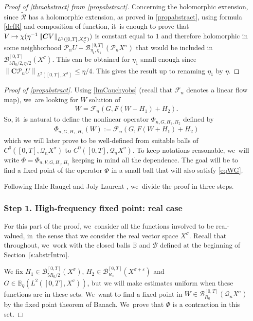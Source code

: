 \documentclass[10pt]{amsart}
\newcommand\mto{\mathchoice{\longmapsto}{\mapsto}{\mapsto}{\mapsto}}
\theoremstyle{definition}
\let\mc\mathcal
\let\veps\varepsilon
\newcommand{\B}{\mc{B}}
\newcommand{\Q}{\mathcal{Q}}
\renewcommand{\P}{\mathcal{P}}
\newcommand{\bC}{\boldsymbol{C}}
\newcommand\nor[2]{\left\|#1\right\|_{#2}}
\newcommand\FL{\mathcal{F}_{n}}
\begin{document}
\begin{proof}[Proof of \cref{thmabstract} from \cref{propabstract}]
Concerning the holomorphic extension, since $\mathcal{\widetilde{R}}$ has a holomorphic extension, as proved in \cref{propabstract}, using formula \eqref{defR} and composition of function, it~is enough to prove that $V\mto \chi(\eta^{-1} \nor{\bC V}{L^{2}([0,T],X^{\sigma}_{\mathbb{C}})})$ is constant equal to $1$ and therefore holomorphic in some neighborhood $\P_nU+ \B_{\eta_{1},\eta_{1}}^{[0,T]}(\P_n X^{\sigma})$ that would be included in $\B_{3R_0/2,\eta/2}^{[0,T]}(X^{\sigma})$. This can be obtained for $\eta_{1}$ small enough since $ \nor{\bC \P_n U}{L^{2}([0,T],X^{\sigma})}\leq \eta/4$. This gives the result up to renaming $\eta_{1}$ by $\eta$.
\end{proof}

\begin{proof}[Proof of \cref{propabstract}]
Using \cref{lmCauchyobs} (recall that $\FL$ denotes a linear flow map), we~are looking for $W$ solution of\vspace*{-3pt}
\begin{align*}
W=\FL (G,F(W+H_{1})+H_{2}).
\end{align*}
So, it~is natural to define the nonlinear operator $\Phi_{n,G,H_{1},H_{2}}$ defined by\vspace*{-3pt}
\begin{align}\label{defPhi}
\Phi_{n,G,H_{1},H_{2}}(W):=\FL (G,F(W+H_{1})+H_{2})
\end{align}
which we will later prove to be well-defined from suitable balls of $C^0([0, T], \Q_n X^\sigma)$ to $C^0([0, T], \Q_n X^\sigma)$. To keep notations reasonable, we~will write $\Phi=\Phi_{n,V,G,H_{1},H_{2}}$ keeping in mind all the dependence. The goal will be to find a fixed point of the operator $\Phi$ in a small ball that will also satisfy \eqref{eqWG}.

Following Hale-Raugel \cite[Th.\,2.14]{HR03} and Joly-Laurent \cite[Th.\,10.1]{2020:joly-laurent:decay-nlw-no-gcc}, we~divide the proof in three steps.

\subsubsection*{Step 1. High-frequency fixed point: real case} For this part of the proof, we~consider all the functions involved to be real-valued, in~the sense that we consider the real vector space $X^{\sigma}$. Recall that throughout, we~work with the closed balls $\mathbb{B}$ and $\B$ defined at the beginning of Section~\ref{s:abstrIntro}.

We fix $H_{1}\in \B_{5R_{0}/2}^{[0,T]}(X^{\sigma})$, $H_{2}\in \B_{R_{0}}^{[0,T]}(X^{\sigma+\veps})$ and $G\in \mathbb{B}_{\eta}(L^2([0, T], X^{\sigma}))$, but we will make estimates uniform when these functions are in these sets. We~want to find a fixed point in $W\in \B_{R_{0}}^{[0,T]}(\Q_n X^{\sigma})$ by the fixed point theorem of Banach. We~prove that $\Phi$ is a contraction in this set.


\end{proof}
\end{document}
